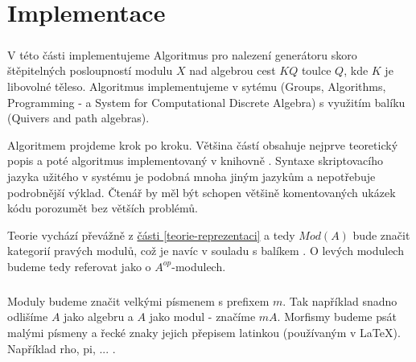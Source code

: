 \renewcommand{\section}[1]{ 
  \oldsection{#1}
}



\chapter{Implementace}\label{implementace}

  \paragraph{ } V této části implementujeme Algoritmus pro nalezení generátoru skoro štěpitelných 
  posloupností modulu $X$ nad algebrou cest $KQ$ toulce $Q$, kde $K$ je libovolné těleso.    
  Algoritmus implementujeme v sytému \cite{GAP4} (Groups, Algorithms, Programming -
a System for Computational Discrete Algebra) s využitím balíku \cite{QPA} (Quivers and path 
algebras).
  
  Algoritmem projdeme krok po kroku. Většina částí obsahuje nejprve teoretický popis
  a poté algoritmus implementovaný v 
  knihovně \cite{QPA}.  
  Syntaxe skriptovacího jazyka užitého v systému \cite{GAP4} je podobná mnoha 
  jiným  jazykům a nepotřebuje podrobnější výklad. Čtenář by měl být 
  schopen většině komentovaných ukázek kódu porozumět bez větších problémů.

    Teorie vychází převážně z \hyperref[teorie-reprezentaci]{části \ref*{teorie-reprezentaci}} 
    a tedy $Mod(A)$ bude značit kategorií pravých modulů, což je navíc  
    v souladu s balíkem \cite{QPA}. O levých modulech budeme tedy referovat jako 
    o $A^{op}$-modulech.
    
  \section{Značení v kódu QPA}
    \paragraph{ } Moduly budeme značit velkými písmenem s prefixem $m$. Tak například 
    snadno odlišíme $A$ 
    jako algebru a $A$ jako modul - značíme $mA$.    
    Morfismy budeme psát malými písmeny a řecké znaky jejich přepisem latinkou 
    (používaným v \LaTeX). Například rho, pi, ... .  
        
